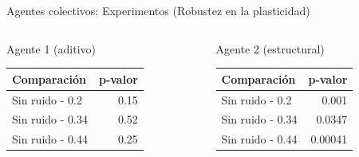 \documentclass[aspectratio=169]{beamer}
\begin{document}
\begin{frame}{Agentes colectivos: Experimentos (Robustez en la plasticidad)}
  \begin{columns}
    \begin{column}{0.47\textwidth}
      \begin{block}{Agente 1 (aditivo)}
        \begin{table}
         \begin{tabular}{lr}
           \toprule
           Comparación & p-valor\\
           \midrule
           Sin ruido - 0.2 & 0.15\\
           Sin ruido - 0.34 & 0.52\\
           Sin ruido - 0.44 & 0.25\\
           \bottomrule
         \end{tabular}
       \end{table}
    \end{block}
    \end{column}
    \begin{column}{0.5\textwidth}
      \begin{block}{Agente 2 (estructural)}
        \begin{table}
         \begin{tabular}{lr}
           \toprule
           Comparación & p-valor\\
           \midrule
           Sin ruido - 0.2 & 0.001\\
           Sin ruido - 0.34 & 0.0347\\
           Sin ruido - 0.44 & 0.00041\\
           \bottomrule
         \end{tabular}
       \end{table}
      \end{block}
    \end{column}
  \end{columns}
\end{frame}
\end{document}
